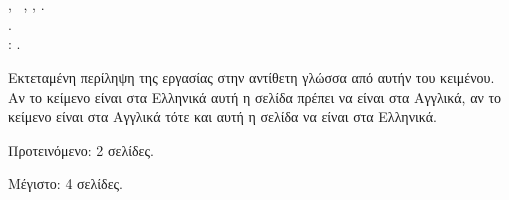\chapter*{\cseextabstract}
\addstarredchapter{\cseextabstract} %

\makeatletter
\authorBilingual, \cseextabstracttype\ifPhD\else\ \cseextabstractcs\fi, \cseextabstractdpt, \dateBilingual.\\
\titleBilingual.\\
\cseextabstractsup: \advisorBilingual.
\makeatother

\bigskip
\bigskip

\noindent Εκτεταμένη περίληψη της εργασίας στην αντίθετη γλώσσα από αυτήν του κειμένου.
Αν το κείμενο είναι στα Ελληνικά αυτή η σελίδα πρέπει να είναι στα Αγγλικά, αν το κείμενο είναι στα Αγγλικά τότε και αυτή η σελίδα να είναι στα Ελληνικά.

\bigskip

\noindent Προτεινόμενο: 2 σελίδες.

\noindent Μέγιστο: 4 σελίδες.